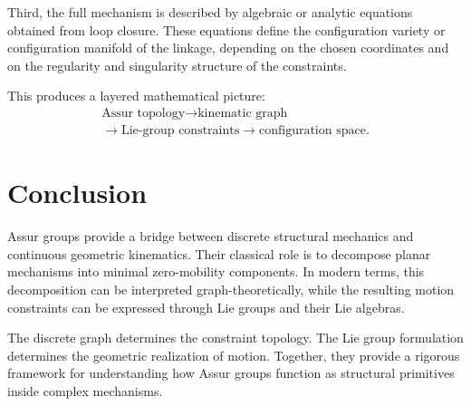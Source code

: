 Third, the full mechanism is described by algebraic or analytic equations obtained from loop closure. These equations define the configuration variety or configuration manifold of the linkage, depending on the chosen coordinates and on the regularity and singularity structure of the constraints.

This produces a layered mathematical picture:
\[
\begin{gathered}
\text{Assur topology}
\longrightarrow
\text{kinematic graph}\\
\longrightarrow
\text{Lie-group constraints}
\longrightarrow
\text{configuration space}.
\end{gathered}
\]

\section{Conclusion}

Assur groups provide a bridge between discrete structural mechanics and continuous geometric kinematics. Their classical role is to decompose planar mechanisms into minimal zero-mobility components. In modern terms, this decomposition can be interpreted graph-theoretically, while the resulting motion constraints can be expressed through Lie groups and their Lie algebras.

The discrete graph determines the constraint topology. The Lie group formulation determines the geometric realization of motion. Together, they provide a rigorous framework for understanding how Assur groups function as structural primitives inside complex mechanisms.
